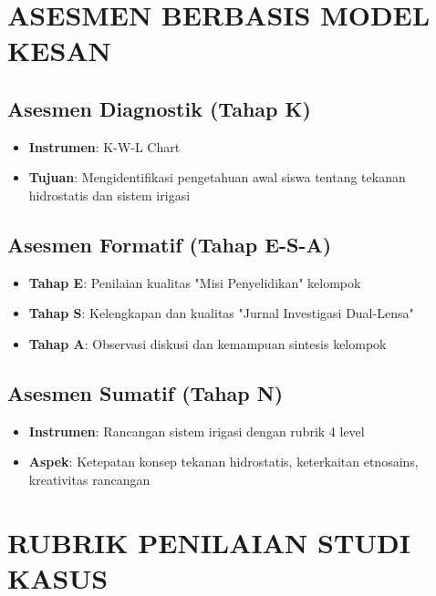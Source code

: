 \documentclass[12pt,a4paper]{article}
\begin{document}
\section{ASESMEN BERBASIS MODEL KESAN}

\subsection{Asesmen Diagnostik (Tahap K)}
\begin{itemize}
\item \textbf{Instrumen}: K-W-L Chart
\item \textbf{Tujuan}: Mengidentifikasi pengetahuan awal siswa tentang tekanan hidrostatis dan sistem irigasi
\end{itemize}

\subsection{Asesmen Formatif (Tahap E-S-A)}
\begin{itemize}
\item \textbf{Tahap E}: Penilaian kualitas "Misi Penyelidikan" kelompok
\item \textbf{Tahap S}: Kelengkapan dan kualitas "Jurnal Investigasi Dual-Lensa"
\item \textbf{Tahap A}: Observasi diskusi dan kemampuan sintesis kelompok
\end{itemize}

\subsection{Asesmen Sumatif (Tahap N)}
\begin{itemize}
\item \textbf{Instrumen}: Rancangan sistem irigasi dengan rubrik 4 level
\item \textbf{Aspek}: Ketepatan konsep tekanan hidrostatis, keterkaitan etnosains, kreativitas rancangan
\end{itemize}

\section{RUBRIK PENILAIAN STUDI KASUS}
\end{document}
